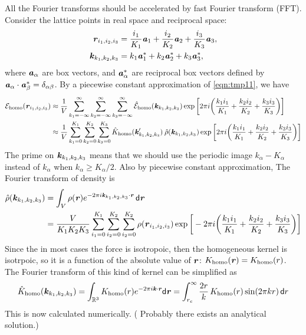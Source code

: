 \documentclass[aps,pre,preprint]{revtex4}
\newcommand{\recheck}[1]{{\color{red} #1}}
\renewcommand{\v}[1]{\textbf{\textit{#1}}}
\renewcommand{\d}[1]{\textsf{#1}}
\begin{document}
All the Fourier transforms should be accelerated by fast Fourier
transform (FFT). Consider the lattice points in real space and
reciprocal space:
\begin{align}
  \v r_{i_1, i_2, i_3} & =
  \frac{i_1}{K_1}\v a_1 + 
  \frac{i_2}{K_2}\v a_2 + 
  \frac{i_3}{K_3}\v a_3, \\
  \v k_{k_1, k_2, k_3} & =
  k_1\v a_1^\ast +
  k_2\v a_2^\ast +
  k_3\v a_3^\ast,
\end{align}
where $\v a_\alpha$ are box vectors, and $\v a_\alpha^\ast$ are
reciprocal box vectors defined by $\v a_\alpha\cdot\v a_\beta^\ast =
\delta_{\alpha\beta}$. By a piecewise constant approximation of
\eqref{eqn:tmp11}, we have
\begin{align}\nonumber
  \mathcal E_{\textrm{homo}}(\v r_{i_1,i_2,i_3})
  & \approx
  \frac1V\sum_{k_1=-\infty}^\infty\sum_{k_2=-\infty}^\infty\sum_{k_3=-\infty}^\infty
  \hat{\mathcal E}_{\textrm{homo}}(\v k_{k_1,k_2,k_3})
  \exp\bigg[
  2\pi i\bigg(
  \frac{k_1i_1}{K_1} + \frac{k_2i_2}{K_2} + \frac{k_3i_3}{K_3}
  \bigg)
  \bigg] \\
  & \approx
  \frac1V\sum_{k_1=0}^{K_1}\sum_{k_2=0}^{K_2}\sum_{k_3=0}^{K_3}
  \hat{K}_{\textrm{homo}}(\v k'_{k_1,k_2,k_3})\:
  \hat{\rho}(\v k_{k_1,k_2,k_3})
  \exp\bigg[
  2\pi i\bigg(
  \frac{k_1i_1}{K_1} + \frac{k_2i_2}{K_2} + \frac{k_3i_3}{K_3}
  \bigg)
  \bigg]   
\end{align}
The prime on $\v k_{k_1,k_2,k_3}$ means that we should use the
periodic image $k_\alpha - K_\alpha$ instead of $k_\alpha$ when $k_\alpha \geq
K_\alpha/2$. Also by piecewise constant approximation, The Fourier
transform of density is 
\begin{align}\nonumber
  \hat\rho(\v k_{k_1,k_2,k_3})
  &=
  \int_V\rho(\v r)e^{-2\pi i\v k_{k_1,k_2,k_3}\cdot\v r}\,\d d\v r \\
  & =
  \frac{V}{K_1K_2K_3}
  \sum_{i_1=0}^{K_1}\sum_{i_2=0}^{K_2}\sum_{i_2=0}^{K_2}
  \rho(\v r_{i_1,i_2,i_3})
  \exp\bigg[
  -2\pi i\bigg(
  \frac{k_1i_1}{K_1} + \frac{k_2i_2}{K_2} + \frac{k_3i_3}{K_3}
  \bigg)
  \bigg]
\end{align}
Since the in most cases the force is isotropoic, then the homogeneous
kernel is isotrpoic, so it is a function of the absolute value of $\v
r$: $K_{\textrm{homo}}(\v r) = K_{\textrm{homo}}(r)$. The Fourier
transform of this kind of kernel can be simplified as
\begin{align}
  \hat{K}_{\textrm{homo}}(\v k_{k_1,k_2,k_3})
  =
  \int_{\mathbb R^3}K_{\textrm{homo}}(r)e^{-2\pi i\v k\cdot\v r}\d d\v r
  =
  \int_{r_c}^\infty \frac{2 r}k\, K_{\textrm{homo}}(r) \sin(2\pi kr)\,\d dr
\end{align}
This is now calculated numerically. (\recheck{Probably there exists an
analytical solution.})
\end{document}
